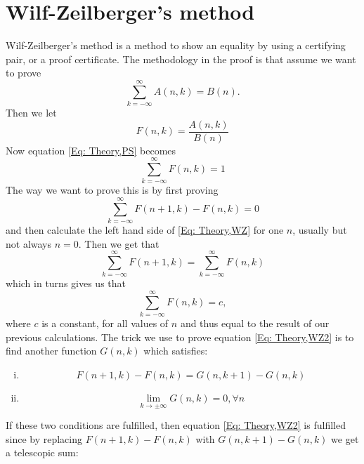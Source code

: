 \section{Wilf-Zeilberger's method}
Wilf-Zeilberger's method is a method to show an equality by using a certifying pair, or a proof certificate. The methodology in the proof  is that assume we want to prove %
\begin{equation}\label{Eq: Theory,PS}
  \sum_{k=-\infty}^\infty A(n,k) = B(n).
\end{equation}
Then we let
\begin{equation}
  F(n,k)=\frac{A(n,k)}{B(n)}
\end{equation}
Now equation \ref{Eq: Theory,PS} becomes
\begin{equation}\label{Eq: Theory,WZ}
  \sum_{k=-\infty}^\infty F(n,k) = 1
\end{equation}
The way we want to prove this is by first proving
\begin{equation}\label{Eq: Theory,WZ2}
  \sum_{k=-\infty}^\infty F(n+1,k)-F(n,k) = 0
\end{equation}
and then calculate the left hand side of \ref{Eq: Theory,WZ} for one $n$, usually but not always $n=0$. Then we get that
\begin{equation}
  \sum_{k=-\infty}^\infty F(n+1,k)=\sum_{k=-\infty}^\infty F(n,k)
\end{equation}
which in turns gives us that
\begin{equation}
  \sum_{k=-\infty}^\infty F(n,k) = c,
\end{equation}
where $c$ is a constant, for all values of $n$ and thus equal to the result of our previous calculations. The trick we use to prove equation \ref{Eq: Theory,WZ2} is to find another function $G(n,k)$ which satisfies:
\begin{enumerate}[i)]
  \item
  \begin{equation}\label{Eq: Theory,first condition}
    F(n+1,k)-F(n,k)=G(n,k+1)-G(n,k)
  \end{equation}
  \item
  \begin{equation}\label{Eq: Theory,second condition}
    \lim_{k\to\pm\infty}G(n,k)=0, \forall n
  \end{equation}
\end{enumerate}
If these two conditions are fulfilled, then equation \ref{Eq: Theory,WZ2} is fulfilled since by replacing $F(n+1,k)-F(n,k)$ with $G(n,k+1)-G(n,k)$ we get a telescopic sum:
